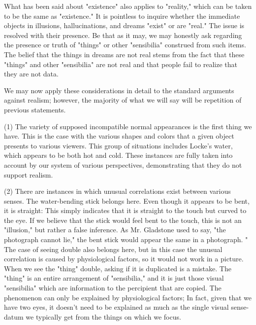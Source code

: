 \documentclass[a4paper,12pt]{book}[2004/02/16]
\theoremstyle{ilemma}
\theoremstyle{itheorem}
\theoremstyle{iother}
\theoremstyle{icorollary}
\theoremstyle{numcorollary}
\theoremstyle{idefinition}
\begin{document}
What has been said about "existence" also applies to "reality," which can be taken to be the same as "existence."
It is pointless to inquire whether the immediate objects in illusions, hallucinations, and dreams "exist" or are "real."
The issue is resolved with their presence. Be that as it may, we may honestly
ask regarding the presence or truth of "things" or other
"sensibilia" construed from such items. The belief that the things in dreams are not real stems from the fact that these "things" and other "sensibilia" are not real and that people fail to realize that they are not data.

We may now apply these considerations in detail to the standard arguments against realism; however, the majority of what we will say will be repetition of previous statements.

(1) The variety of supposed incompatible normal appearances is the first thing we have. This is the case with the various shapes and colors that a given object presents to various viewers. This group of situations includes Locke's water, which appears to be both hot and cold. These instances are fully taken into account by our system of various perspectives, demonstrating that they do not support realism.

(2) There are instances in which unusual correlations exist between various senses. The water-bending stick belongs here. Even though it appears to be bent, it is straight: This simply indicates that it is straight to the touch but curved to the eye. If we believe that the stick would feel bent to the touch, this is not an "illusion," but rather a false inference.
As Mr. Gladstone used to say, "the photograph cannot lie," the bent stick would appear the same in a photograph. " The case of seeing double also belongs here, but in this case the unusual correlation is caused by physiological factors, so it would not work in a picture. When we see the "thing" double, asking if it is duplicated is a mistake. The "thing" is an entire arrangement of
"sensibilia," and it is just those visual "sensibilia" which are information
to the percipient that are copied. The phenomenon can only be explained by physiological factors; In fact, given that we have two eyes, it doesn't need to be explained as much as the single visual sense-datum we typically get from the things on which we focus.
\end{document}
